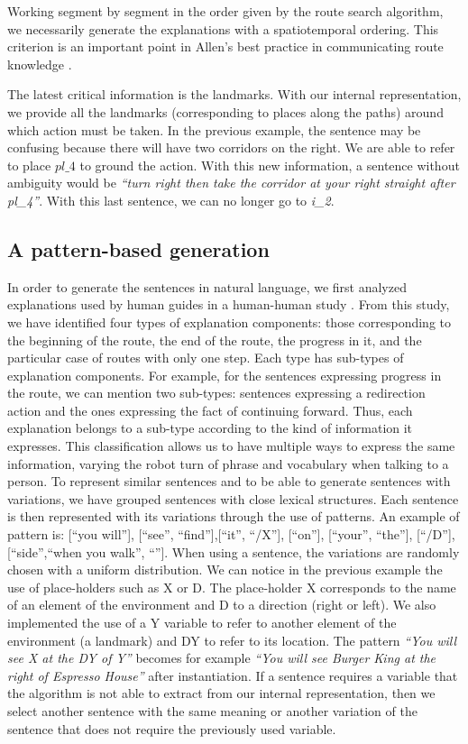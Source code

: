 Working segment by segment in the order given by the route search algorithm, we necessarily generate the explanations with a spatiotemporal ordering. This criterion is an important point in Allen's best practice in communicating route knowledge \cite{allen_2000_principles}.

The latest critical information is the landmarks. With our internal representation, we provide all the landmarks (corresponding to places along the paths) around which action must be taken. In the previous example, the sentence may be confusing because there will have two corridors on the right. We are able to refer to place $pl\_4$ to ground the action. With this new information, a sentence without ambiguity would be \textit{``turn right then take the corridor at your right straight after pl\_4''}. With this last sentence, we can no longer go to \textit{i\_2}.

\subsection{A pattern-based generation}

In order to generate the sentences in natural language, we first analyzed explanations used by human guides in a human-human study \cite{belhassein_2017_human}. From this study, we have identified four types of explanation components: those corresponding to the beginning of the route, the end of the route, the progress in it, and the particular case of routes with only one step. Each type has sub-types of explanation components. For example, for the sentences expressing progress in the route, we can mention two sub-types: sentences expressing a redirection action and the ones expressing the fact of continuing forward. Thus, each explanation belongs to a sub-type according to the kind of information it expresses. This classification allows us to have multiple ways to express the same information, varying the robot turn of phrase and vocabulary when talking to a person. To represent similar sentences and to be able to generate sentences with variations, we have grouped sentences with close lexical structures. Each sentence is then represented with its variations through the use of patterns. An example of pattern is: [``you will''], [``see'', ``find''],[``it'', ``/X''], [``on''], [``your'', ``the''], [``/D''],[``side'',``when you walk'', ``'']. When using a sentence, the variations are randomly chosen with a uniform distribution. We can notice in the previous example the use of place-holders such as X or D. The place-holder X corresponds to the name of an element of the environment and D to a direction (right or left). We also implemented the use of a Y variable to refer to another element of the environment (a landmark) and DY to refer to its location. The pattern \textit{``You will see X at the DY of Y''}  becomes for example \textit{``You will see Burger King at the right of Espresso House''} after instantiation. If a sentence requires a variable that the algorithm is not able to extract from our internal representation, then we select another sentence with the same meaning or another variation of the sentence that does not require the previously used variable.

